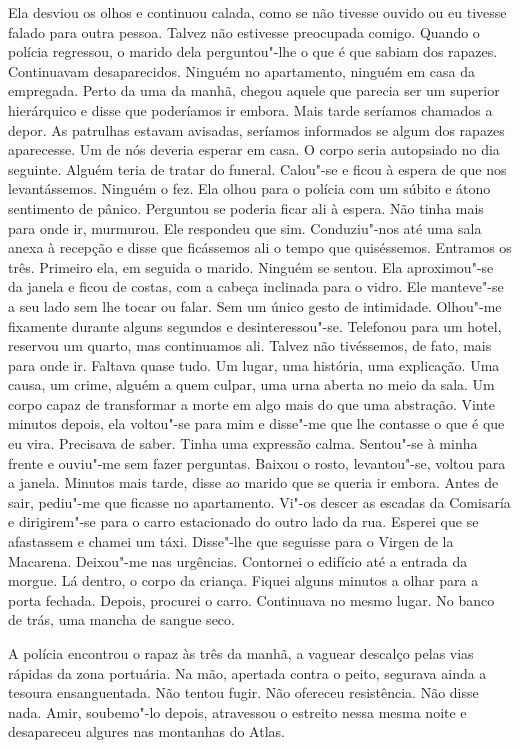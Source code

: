 Ela desviou os olhos e continuou calada, como se não tivesse ouvido ou
eu tivesse falado para outra pessoa. Talvez não estivesse preocupada
comigo. Quando o polícia regressou, o marido dela perguntou"-lhe o que é
que sabiam dos rapazes. Continuavam desaparecidos. Ninguém no
apartamento, ninguém em casa da empregada. Perto da uma da manhã, chegou
aquele que parecia ser um superior hierárquico e disse que poderíamos ir
embora. Mais tarde seríamos chamados a depor. As patrulhas estavam
avisadas, seríamos informados se algum dos rapazes aparecesse. Um de nós
deveria esperar em casa. O corpo seria autopsiado no dia seguinte.
Alguém teria de tratar do funeral. Calou"-se e ficou à espera de que nos
levantássemos. Ninguém o fez. Ela olhou para o polícia com um súbito e
átono sentimento de pânico. Perguntou se poderia ficar ali à espera. Não
tinha mais para onde ir, murmurou. Ele respondeu que sim. Conduziu"-nos
até uma sala anexa à recepção e disse que ficássemos ali o tempo que
quiséssemos. Entramos os três. Primeiro ela, em seguida o marido.
Ninguém se sentou. Ela aproximou"-se da janela e ficou de costas, com a
cabeça inclinada para o vidro. Ele manteve"-se a seu lado sem lhe tocar
ou falar. Sem um único gesto de intimidade. Olhou"-me fixamente durante
alguns segundos e desinteressou"-se. Telefonou para um hotel, reservou
um quarto, mas continuamos ali. Talvez não tivéssemos, de fato, mais
para onde ir. Faltava quase tudo. Um lugar, uma história, uma
explicação. Uma causa, um crime, alguém a quem culpar, uma urna aberta
no meio da sala. Um corpo capaz de transformar a morte em algo mais do
que uma abstração. Vinte minutos depois, ela voltou"-se para mim e
disse"-me que lhe contasse o que é que eu vira. Precisava de saber.
Tinha uma expressão calma. Sentou"-se à minha frente e ouviu"-me sem
fazer perguntas. Baixou o rosto, levantou"-se, voltou para a janela.
Minutos mais tarde, disse ao marido que se queria ir embora. Antes de
sair, pediu"-me que ficasse no apartamento. Vi"-os descer as escadas da
Comisaría e dirigirem"-se para o carro estacionado do outro lado da rua.
Esperei que se afastassem e chamei um táxi. Disse"-lhe que seguisse para
o Virgen de la Macarena. Deixou"-me nas urgências. Contornei o edifício
até a entrada da morgue. Lá dentro, o corpo da criança. Fiquei alguns
minutos a olhar para a porta fechada. Depois, procurei o carro.
Continuava no mesmo lugar. No banco de trás, uma mancha de sangue seco.

A polícia encontrou o rapaz às três da manhã, a vaguear descalço pelas
vias rápidas da zona portuária. Na mão, apertada contra o peito,
segurava ainda a tesoura ensanguentada. Não tentou fugir. Não ofereceu
resistência. Não disse nada. Amir, soubemo"-lo depois, atravessou o
estreito nessa mesma noite e desapareceu algures nas montanhas do Atlas.



